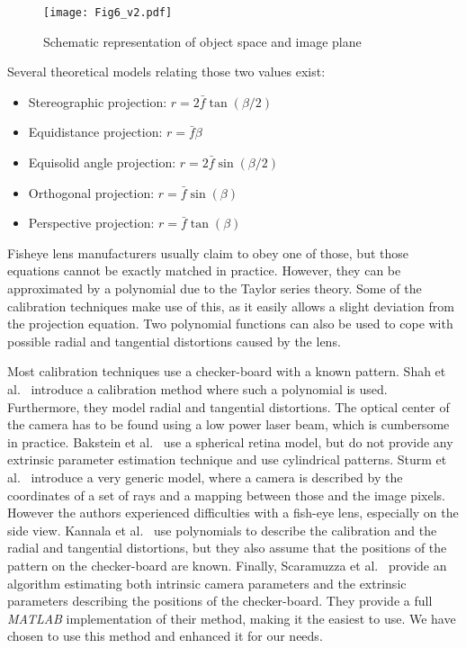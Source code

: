 \begin{figure}[htbp]
\begin{center}
\texttt{[image: Fig6\_v2.pdf]}
\caption{Schematic representation of object space and image plane\label{fig:Fig6}}
\end{center}
\end{figure}

Several theoretical models relating those two values exist:

\begin{itemize}
\item Stereographic projection: $r=2\bar{f}\tan(\beta/2)$
\item Equidistance projection: $r=\bar{f}\beta$
\item Equisolid angle projection: $r=2\bar{f}\sin(\beta/2)$
\item Orthogonal projection: $r=\bar{f}\sin(\beta)$
\item Perspective projection: $r=\bar{f}\tan(\beta)$
\end{itemize}

Fisheye lens manufacturers usually claim to obey one of those, but those equations cannot be exactly matched in practice. However, they can be approximated by a polynomial due to the Taylor series theory. Some of the calibration techniques make use of this, as it easily allows a slight deviation from the projection equation. Two polynomial functions can also be used to cope with possible radial and tangential distortions caused by the lens. 

Most calibration techniques use a checker-board with a known pattern. Shah et al.~\cite{shah1996intrinsic} introduce a calibration method where such a polynomial is used. Furthermore, they model radial and tangential distortions. The optical center of the camera has to be found using a low power laser beam, which is cumbersome in practice. Bakstein et al.~\cite{bakstein2002panoramic} use a spherical retina model, but do not provide any extrinsic parameter estimation technique and use cylindrical patterns. Sturm et al.~\cite{sturm2004generic} introduce a very generic model, where a camera is described by the coordinates of a set of rays and a mapping between those and the image pixels. However the authors experienced difficulties with a fish-eye lens, especially on the side view.  Kannala et al.~\cite{Kannala_calib} use polynomials to describe the calibration and the radial and tangential distortions, but they also assume that the positions of the pattern on the checker-board are known.  Finally, Scaramuzza et al.~\cite{scaramuzza2006toolbox} provide an algorithm estimating both intrinsic camera parameters and the extrinsic parameters describing the positions of the checker-board. They provide a full \emph{MATLAB} implementation of their method, making it the easiest to use.  We have chosen to use this method and enhanced it for our needs.

